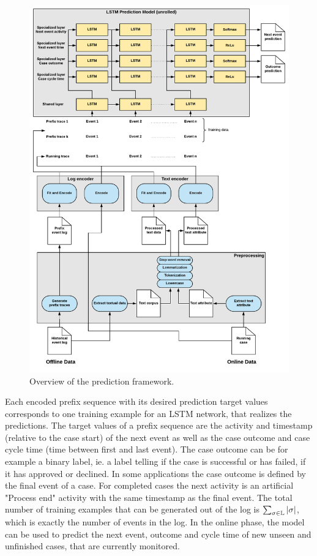 \begin{figure}[!htbp]
	\includegraphics[width=\textwidth]{figures/framework}
	\caption{Overview of the prediction framework.}
	\label{fig:framework}
\end{figure}

Each encoded prefix sequence with its desired prediction target values corresponds to one training example for an LSTM network, that realizes the predictions. 
The target values of a prefix sequence are the activity and timestamp (relative to the case start) of the next event as well as the case outcome and case cycle time (time between first and last event).
The case outcome can be for example a binary label, ie. a label telling if the case is successful or has failed, if it has approved or declined.
In some applications the case outcome is defined by the final event of a case.
For completed cases the next activity is an artificial "Process end" activity with the same timestamp as the final event.
The total number of training examples that can be generated out of the log is $\sum_{\sigma \in \mathbb{L}}|\sigma|$, which is exactly the number of events in the log.
In the online phase, the model can be used to predict the next event, outcome and cycle time of new unseen and unfinished cases, that are currently monitored.


